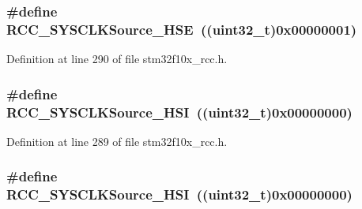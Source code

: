 \subsubsection[{\texorpdfstring{R\+C\+C\+\_\+\+S\+Y\+S\+C\+L\+K\+Source\+\_\+\+H\+SE}{RCC_SYSCLKSource_HSE}}]{\setlength{\rightskip}{0pt plus 5cm}\#define R\+C\+C\+\_\+\+S\+Y\+S\+C\+L\+K\+Source\+\_\+\+H\+SE~(({\bf uint32\+\_\+t})0x00000001)}\hypertarget{group___system__clock__source_gabeae110e41833842f8620647ea0ce85a}{}\label{group___system__clock__source_gabeae110e41833842f8620647ea0ce85a}


Definition at line 290 of file stm32f10x\+\_\+rcc.\+h.

\subsubsection[{\texorpdfstring{R\+C\+C\+\_\+\+S\+Y\+S\+C\+L\+K\+Source\+\_\+\+H\+SI}{RCC_SYSCLKSource_HSI}}]{\setlength{\rightskip}{0pt plus 5cm}\#define R\+C\+C\+\_\+\+S\+Y\+S\+C\+L\+K\+Source\+\_\+\+H\+SI~(({\bf uint32\+\_\+t})0x00000000)}\hypertarget{group___system__clock__source_ga0f392254e74dd965c48edd5aad148e20}{}\label{group___system__clock__source_ga0f392254e74dd965c48edd5aad148e20}


Definition at line 289 of file stm32f10x\+\_\+rcc.\+h.

\subsubsection[{\texorpdfstring{R\+C\+C\+\_\+\+S\+Y\+S\+C\+L\+K\+Source\+\_\+\+H\+SI}{RCC_SYSCLKSource_HSI}}]{\setlength{\rightskip}{0pt plus 5cm}\#define R\+C\+C\+\_\+\+S\+Y\+S\+C\+L\+K\+Source\+\_\+\+H\+SI~(({\bf uint32\+\_\+t})0x00000000)}\hypertarget{group___system__clock__source_ga0f392254e74dd965c48edd5aad148e20}{}\label{group___system__clock__source_ga0f392254e74dd965c48edd5aad148e20}


